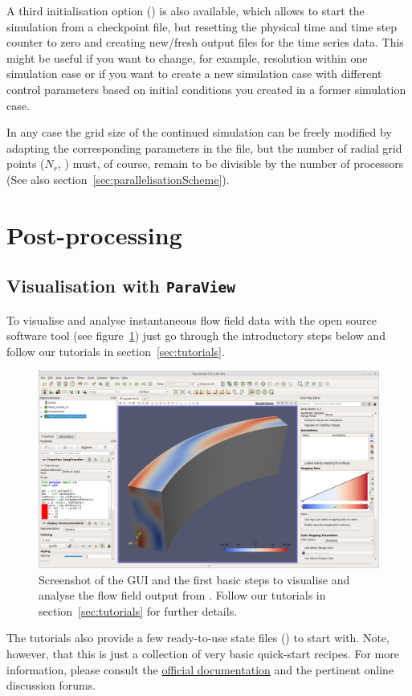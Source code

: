\documentclass[a4paper, 11pt, DIV=11]{scrartcl}
\begin{document}
A third initialisation option () is also available, which allows
to start the simulation from a checkpoint file, but resetting the physical time
and time step counter to zero and creating new/fresh output files for the time
series data. This might be useful if you want to change, for example, resolution
within one simulation case or if you want to create a new simulation case with
different control parameters based on initial conditions you created in a former
simulation case. 
\par
In any case the grid size of the continued simulation can be freely modified by
adapting the corresponding parameters in the  file, but the
number of radial grid points ($N_r$, ) must, of course, remain to be
divisible by the number of processors (See also section~\ref{sec:parallelisationScheme}).



\section{Post-processing}

\subsection{Visualisation with \texttt{\textbf{ParaView}}}
\label{sec:paraview}

To visualise and analyse instantaneous flow field data with the open source software
tool \paraview (see figure~\ref{fig:paraViewFlowField}) just go through the introductory
steps below and follow our tutorials in section~\ref{sec:tutorials}.
\begin{figure}[htb]
\includegraphics[width=1.00\linewidth]{figures/paraViewFlowField.png}
\caption{Screenshot of the \paraview GUI and the first basic steps to
visualise and analyse the \hdf flow field output from \nsc. Follow our
tutorials in section~\ref{sec:tutorials} for further details.}
\label{fig:paraViewFlowField}
\end{figure}
The tutorials also provide a few ready-to-use state files ()
to start with. Note, however, that this is just a collection of very
basic quick-start recipes. For more information, please consult the
\href{https://www.paraview.org/Wiki/The_ParaView_Tutorial}{official documentation}
\cite{Moreland2018} and the pertinent online discussion forums.
\end{document}
